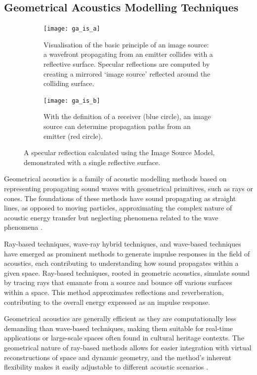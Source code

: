 \subsection{Geometrical Acoustics Modelling Techniques}\label{sec:bg-raytracing}
\begin{figure}
    \begin{subfigure}[t]{\linewidth}
        \centering
        \texttt{[image: ga\_is\_a]}
        \caption{Visualisation of the basic principle of an image source: a wavefront propagating from an emitter collides with a reflective surface. Specular reflections are computed by creating a mirrored `image source' reflected around the colliding surface.}
    \end{subfigure}

    \begin{subfigure}[b]{\linewidth}
        \centering
        \texttt{[image: ga\_is\_b]}
        \caption{With the definition of a receiver (blue circle), an image source can determine propagation paths from an emitter (red circle).}
    \end{subfigure}
    \caption[Image Source Visualisation]{A specular reflection calculated using the Image Source Model, demonstrated with a single reflective surface.}
\end{figure}
Geometrical acoustics is a family of acoustic modelling methods based on representing propagating sound waves with geometrical primitives, such as rays or cones. The foundations of these methods have sound propagating as straight lines, as opposed to moving particles, approximating the complex nature of acoustic energy transfer but neglecting phenomena related to the wave phenomena \citep{savioja2015overview}.\par
Ray-based techniques, wave-ray hybrid techniques, and wave-based techniques have emerged as prominent methods to generate impulse responses in the field of acoustics, each contributing to understanding how sound propagates within a given space. Ray-based techniques, rooted in geometric acoustics, simulate sound by tracing rays that emanate from a source and bounce off various surfaces within a space. This method approximates reflections and reverberation, contributing to the overall energy expressed as an impulse response.\par
Geometrical acoustics are generally efficient as they are computationally less demanding than wave-based techniques, making them suitable for real-time applications or large-scale spaces often found in cultural heritage contexts. The geometrical nature of ray-based methods allows for easier integration with virtual reconstructions of space and dynamic geometry, and the method's inherent flexibility makes it easily adjustable to different acoustic scenarios \citep{vorlander2008simulation}.

